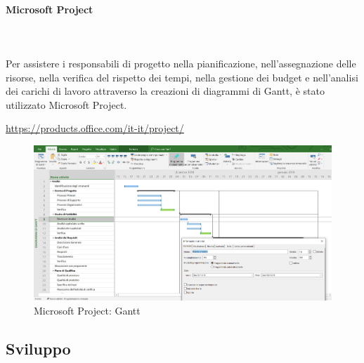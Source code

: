\paragraph{Microsoft Project} \mbox{}\\ \mbox{}\\
Per assistere i responsabili di progetto nella pianificazione, 
nell'assegnazione delle risorse, nella verifica del rispetto dei tempi, nella 
gestione dei budget e nell'analisi dei carichi di lavoro attraverso la creazioni 
di diagrammi di Gantt\glo, è stato utilizzato Microsoft Project. \\
		\centerline{\url{https://products.office.com/it-it/project/}}
	\begin{figure}[H]
		\includegraphics[width=0.99\linewidth]{res/images/projectS.png}
		\caption{Microsoft Project: Gantt}
	\end{figure}
	 

		
		
     
\subsection{Sviluppo}

